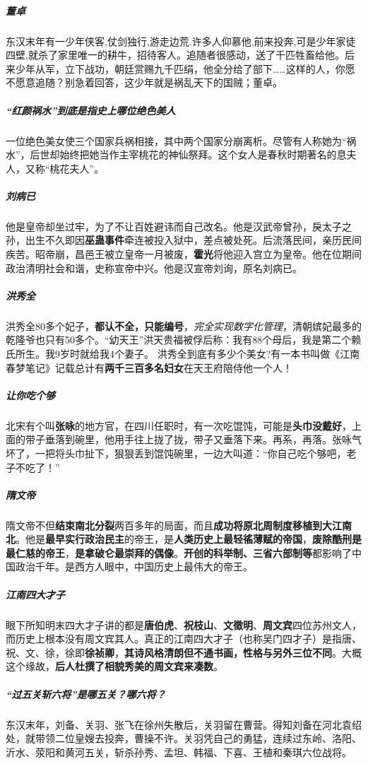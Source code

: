 \documentclass[UTF8,a4paper,12pt]{ctexbook}
\begin{document}
		\subparagraph{董卓}东汉末年有一少年侠客,仗剑独行,游走边荒.许多人仰慕他,前来投奔,可是少年家徒四壁,就杀了家里唯一的耕牛，招待客人。追随者很感动，送了千匹牲畜给他。后来少年从军，立下战功，朝廷赏赐九千匹绢，他全分给了部下……这样的人，你愿不愿意追随？别急着回答，这少年就是祸乱天下的国贼；董卓。
		
		\subparagraph{“红颜祸水”到底是指史上哪位绝色美人}一位绝色美女使三个国家兵祸相接，其中两个国家分崩离析。尽管有人称她为“祸水”，后世却始终把她当作主宰桃花的神仙祭拜。这个女人是春秋时期著名的息夫人，又称“桃花夫人”。
		
		\subparagraph{刘病已}他是皇帝却坐过牢，为了不让百姓避讳而自己改名。他是汉武帝曾孙，戾太子之孙，出生不久即因\textbf{巫蛊事件}牵连被投入狱中，差点被处死。后流落民间，亲历民间疾苦。昭帝崩，昌邑王被立皇帝一月被废，\textbf{霍光}将他迎入宫立为皇帝。他在位期间政治清明社会和谐，史称宣帝中兴。他是汉宣帝刘询，原名刘病已。
		
		\subparagraph{洪秀全}洪秀全80多个妃子，\textbf{都认不全，只能编号}，\textit{完全实现数字化管理}，清朝嫔妃最多的乾隆爷也只有50多个。“幼天王”洪天贵福被俘后称：我有88个母后，我是第二个赖氏所生。我9岁时就给我4个妻子。 洪秀全到底有多少个美女?有一本书叫做《江南春梦笔记》记载总计有\textbf{两千三百多名妇女}在天王府陪侍他一个人！
		
		\subparagraph{让你吃个够}北宋有个叫\textbf{张咏}的地方官，在四川任职时，有一次吃馄饨，可能是\textbf{头巾没戴好}，上面的带子垂落到碗里，他用手往上拢了拢，带子又垂落下来。再系，再落。张咏气坏了，一把将头巾扯下，狠狠丢到馄饨碗里，一边大叫道：“你自己吃个够吧，老子不吃了！”
		
		\subparagraph{隋文帝}隋文帝不但\textbf{结束南北分裂}两百多年的局面，而且\textbf{成功将原北周制度移植到大江南北}。他是\textbf{最早实行政治民主}的帝王，是\textbf{人类历史上最轻徭薄赋的帝国}，\textbf{废除酷刑是最仁慈的帝王}，\textbf{是拿破仑最崇拜的偶像}。\textbf{开创的科举制、三省六部制等}都影响了中国政治千年。是西方人眼中，中国历史上最伟大的帝王。
		
		\subparagraph{江南四大才子}眼下所知明末四大才子讲的都是\textbf{唐伯虎}、\textbf{祝枝山}、\textbf{文徵明}、\textbf{周文宾}四位苏州文人，而历史上根本没有周文宾其人。真正的江南四大才子（也称吴门四才子）是指唐、祝、文、徐，徐即\textbf{徐祯卿}，\textbf{其诗风格清朗但不通书画，性格与另外三位不同}。大概这个缘故，\textbf{后人杜撰了相貌秀美的周文宾来凑数}。
		
		\subparagraph{“过五关斩六将”是哪五关？哪六将？}东汉末年，刘备、关羽、张飞在徐州失散后，关羽留在曹营。得知刘备在河北袁绍处，就带领二位皇嫂去投奔，曹操不许。关羽凭自己的勇猛，连续过东岭、洛阳、沂水、荥阳和黄河五关，斩杀孙秀、孟坦、韩福、下喜、王植和秦琪六位战将。
\end{document}
